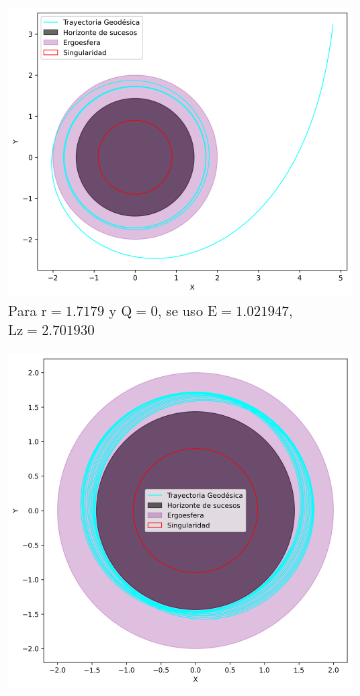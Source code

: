 \begin{figure}[H]
    \centering
    \begin{subfigure}{0.4\textwidth}
        \includegraphics[width=\linewidth]{AgujerosNegros/kerr/geodesics_plots/geodesica_circular_r1,71_Q0_planoxy.png}
        \caption{Para $\mathrm{r}=1.7179$ y $\mathrm{Q}=0$, se uso $\mathrm{E}=1.021947$, $\mathrm{Lz}=2.701930$}
    \end{subfigure}
    \begin{subfigure}{0.4\textwidth}
        \includegraphics[width=\linewidth]{AgujerosNegros/kerr/geodesics_plots/geodesica_circular_r1,71_Q5_planoxy.png}

\end{subfigure}
\end{figure}
